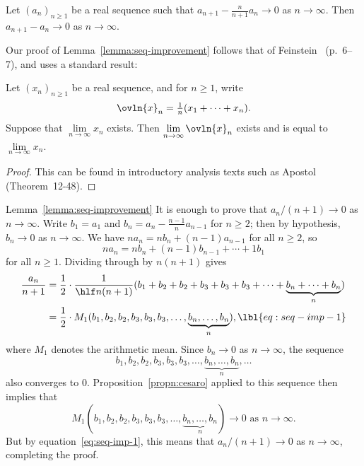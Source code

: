 \begin{lemma}
Let $(a_n)_{n \geq 1}$ be a real sequence such that $a_{n + 1} -
\tfrac{n}{n + 1} a_n \to 0$ as $n \to \infty$.  Then $a_{n + 1} - a_n \to
0$ as $n \to \infty$. 
\end{lemma}

Our proof of Lemma~\ref{lemma:seq-improvement} follows that of
Feinstein~\cite{Fein}%
%
% 
(p.~6--7), and uses a standard result:

\begin{propn}
% 
Let $(x_n)_{n \geq 1}$ be a real sequence, and for $n \geq 1$, write
\[
\ovln{x}_n = \tfrac{1}{n} (x_1 + \cdots + x_n).
\]
Suppose that $\lim\limits_{n \to \infty} x_n$ exists.  Then $\lim\limits_{n
  \to \infty} \ovln{x}_n$ exists and is equal to $\lim\limits_{n \to
  \infty} x_n$.
\end{propn}

\begin{proof}
This can be found in introductory analysis texts such as
Apostol~\cite{AposMA} (Theorem~12-48).
\end{proof}

\begin{pfof}{Lemma~\ref{lemma:seq-improvement}}
It is enough to prove that $a_n/(n + 1) \to 0$ as $n \to \infty$.  Write
$b_1 = a_1$ and $b_n = a_n - \tfrac{n - 1}{n} a_{n - 1}$ for $n \geq 2$;
then by hypothesis, $b_n \to 0$ as $n \to \infty$.  We have $n a_n = nb_n +
(n - 1)a_{n - 1}$ for all $n \geq 2$, so
\[
na_n = nb_n + (n - 1)b_{n - 1} + \cdots + 1b_1
\]
for all $n \geq 1$.  Dividing through by $n(n + 1)$ gives
% 
\begin{align}
\frac{a_n}{n + 1}       &
=
\frac{1}{2} \cdot \frac{1}{\hlf n(n + 1)} 
(b_1 + b_2 + b_2 + b_3 + b_3 + b_3 + \cdots 
+ \underbrace{b_n + \cdots + b_n}_n)    
\nonumber       \\
&
=
\frac{1}{2} \cdot M_1(b_1, b_2, b_2, b_3, b_3, b_3, \ldots, 
\underbrace{b_n, \ldots, b_n}_n),
\lbl{eq:seq-imp-1}
\end{align}
% 
where $M_1$ denotes the arithmetic mean.  Since $b_n \to 0$ as $n \to
\infty$, the sequence
\[
b_1, b_2, b_2, b_3, b_3, b_3, \ldots, 
\underbrace{b_n, \ldots, b_n}_n, \ldots
\]
also converges to $0$.  Proposition~\ref{propn:cesaro} applied to this
sequence then implies that
\[
M_1(b_1, b_2, b_2, b_3, b_3, b_3, \ldots, \underbrace{b_n, \ldots, b_n}_n)
\to 0 
\text{ as } n \to \infty.
\]
But by equation~\eqref{eq:seq-imp-1}, this means that $a_n/(n + 1) \to 0$
as $n \to \infty$, completing the proof.
\end{pfof}

